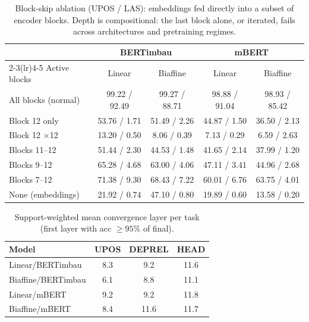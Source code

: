 \begin{table}[t]
\centering
\caption{Block-skip ablation (UPOS / LAS): embeddings fed directly into a subset of encoder blocks. Depth is compositional: the last block alone, or iterated, fails across architectures and pretraining regimes.}
\label{tab:block-skip}
\begin{tabular}{lcccc}
\toprule
 & \multicolumn{2}{c}{BERTimbau} & \multicolumn{2}{c}{mBERT} \\
\cmidrule(lr){2-3}\cmidrule(lr){4-5}
Active blocks & Linear & Biaffine & Linear & Biaffine \\
\midrule
All blocks (normal) & 99.22 / 92.49 & 99.27 / 88.71 & 98.88 / 91.04 & 98.93 / 85.42 \\
Block 12 only & 53.76 / 1.71 & 51.49 / 2.26 & 44.87 / 1.50 & 36.50 / 2.13 \\
Block 12 $\times$12 & 13.20 / 0.50 & 8.06 / 0.39 & 7.13 / 0.29 & 6.59 / 2.63 \\
Blocks 11--12 & 51.44 / 2.30 & 44.53 / 1.48 & 41.65 / 2.14 & 37.99 / 1.20 \\
Blocks 9--12 & 65.28 / 4.68 & 63.00 / 4.06 & 47.11 / 3.41 & 44.96 / 2.68 \\
Blocks 7--12 & 71.38 / 9.30 & 68.43 / 7.22 & 60.01 / 6.76 & 63.75 / 4.01 \\
None (embeddings) & 21.92 / 0.74 & 47.10 / 0.80 & 19.89 / 0.60 & 13.58 / 0.20 \\
\bottomrule
\end{tabular}
\end{table}

\begin{table}[t]
\centering
\caption{Support-weighted mean convergence layer per task (first layer with acc $\geq 95\%$ of final).}
\label{tab:convergence}
\begin{tabular}{lccc}
\toprule
Model & UPOS & DEPREL & HEAD \\
\midrule
Linear/BERTimbau & 8.3 & 9.2 & 11.6 \\
Biaffine/BERTimbau & 6.1 & 8.8 & 11.1 \\
Linear/mBERT & 9.2 & 9.2 & 11.8 \\
Biaffine/mBERT & 8.4 & 11.6 & 11.7 \\
\bottomrule
\end{tabular}
\end{table}

